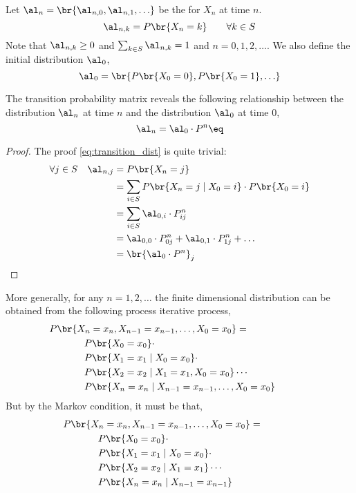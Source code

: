 \documentclass{article}
\newcommand{\val}[1]{X_{#1} = x_{#1}}
\begin{document}
Let $\al_n = \br{\al_{n, 0}, \al_{n, 1}, \ldots}$ be the  for $X_n$ at time $n$.
\[ \al_{n,k} = P\br{X_n = k} \qquad \forall k \in S \]
Note that $\al_{n,k} \geq 0$ and $\sum_{k\in S} \al_{n, k} = 1$ and $n = 0, 1, 2,\ldots$. We also define the initial distribution $\al_0$,
\[ \al_0 = \br{P\br{X_0 = 0}, P\br{X_0 = 1}, \ldots} \]
\begin{theorem}
The transition probability matrix reveals the following relationship between the distribution $\al_n$ at time $n$ and the distribution $\al_0$ at time $0$,
\[ \al_n = \al_0 \cdot P^{n} \eq \label{eq:transition_dist}\]
\end{theorem}
\begin{proof}
The proof \cref{eq:transition_dist} is quite trivial:
\begin{align*}
    \forall j \in S \quad \al_{n, j} &= P\br{X_n = j} \\
     &= \sum_{i \in S} P\br{X_n = j \mid X_0 = i} \cdot P\br{X_0 = i} \\
     &= \sum_{i \in S} \al_{0, i} \cdot P_{ij}^{n} \\
     &= \al_{0, 0} \cdot P_{0j}^{n} + \al_{0, 1} \cdot P_{1j}^{n} + \ldots \\
     &= \br{\al_{0} \cdot P^{n}}_j
\end{align*}
\end{proof}
More generally, for any $n = 1, 2, \ldots$ the finite dimensional distribution can be obtained from the following process iterative process,
\begin{align*}
&\hspace{-0.5in}P\br{X_n=x_n, X_{n-1}=x_{n-1}, \ldots, X_{0}=x_{0}} = \\
&P\br{X_{0} = x_{0}} \cdot\\
&P\br{X_{1} = x_{1} \mid X_0 = x_0} \cdot\\
&P\br{\val{2} \mid \val{1}, \val{0}} \cdots \\
&P\br{\val{n} \mid \val{n-1}, \ldots, \val{0}}
\end{align*}
But by the Markov condition, it must be that,
\begin{align*}
&\hspace{-0.5in}P\br{X_n=x_n, X_{n-1}=x_{n-1}, \ldots, X_{0}=x_{0}} = \\
&P\br{X_{0} = x_{0}} \cdot\\
&P\br{X_{1} = x_{1} \mid X_0 = x_0} \cdot \\
&P\br{\val{2} \mid \val{1}} \cdots \\
&P\br{\val{n} \mid \val{n-1}}
\end{align*}
\end{document}
